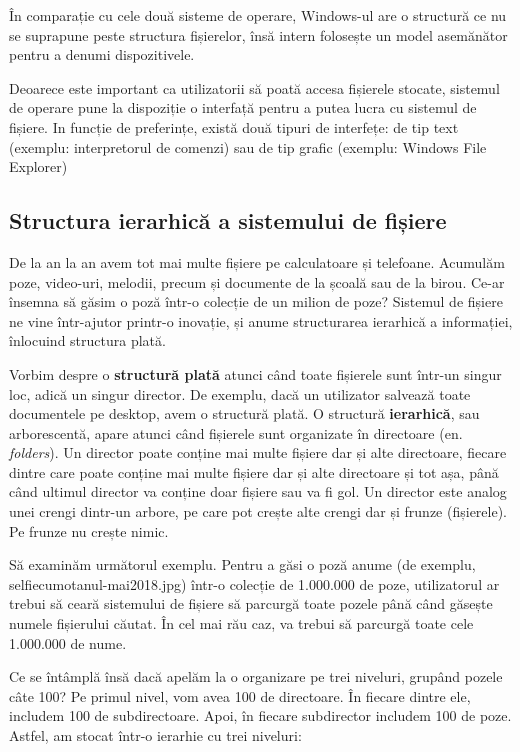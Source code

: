 În comparație cu cele două sisteme de operare, Windows-ul are o structură ce nu
se suprapune peste structura fișierelor, însă intern folosește un model
asemănător pentru a denumi dispozitivele.

Deoarece este important ca utilizatorii să poată accesa fișierele stocate,
sistemul de operare pune la dispoziție o interfață pentru a putea lucra cu
sistemul de fișiere. In funcție de preferințe, există două tipuri de interfețe:
de tip text (exemplu: interpretorul de comenzi) sau de tip grafic (exemplu:
Windows File Explorer)

\subsection{Structura ierarhică a sistemului de fișiere}

De la an la an avem tot mai multe fișiere pe calculatoare și telefoane. Acumulăm
poze, video-uri, melodii, precum și documente de la școală sau de la birou.
Ce-ar însemna să găsim o poză într-o colecție de un milion de poze? Sistemul de
fișiere ne vine într-ajutor printr-o inovație, și anume structurarea ierarhică a
informației, înlocuind structura plată.

Vorbim despre o \textbf{structură plată} atunci când toate fișierele sunt
într-un singur loc, adică un singur director. De exemplu, dacă un utilizator
salvează toate documentele pe desktop, avem o structură plată. O structură
\textbf{ierarhică}, sau arborescentă, apare atunci când fișierele sunt
organizate în directoare (en. \textit{folders}). Un director poate conține mai
multe fișiere dar și alte directoare, fiecare dintre care poate conține mai
multe fișiere dar și alte directoare și tot așa, până când  ultimul director va
conține doar fișiere sau va fi gol. Un director este analog unei crengi dintr-un
arbore, pe care pot crește alte crengi dar și frunze (fișierele). Pe frunze nu
crește nimic.

Să examinăm următorul exemplu. Pentru a găsi o poză anume (de exemplu,
selfiecumotanul-mai2018.jpg) într-o colecție de 1.000.000 de poze, utilizatorul
ar trebui să ceară sistemului de fișiere să parcurgă toate pozele până când
găsește numele fișierului căutat. În cel mai rău caz, va trebui să parcurgă
toate cele 1.000.000 de nume.

Ce se întâmplă însă dacă apelăm la o organizare pe trei niveluri, grupând pozele
câte 100? Pe primul nivel, vom avea 100 de directoare. În fiecare dintre ele,
includem 100 de subdirectoare. Apoi, în fiecare subdirector includem 100 de
poze. Astfel, am stocat într-o ierarhie cu trei niveluri:

